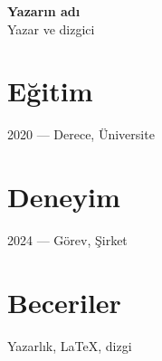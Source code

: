 \documentclass[11pt]{article}
\begin{document}
{\Large\bfseries Yazarın adı}\\[4pt]
{\large Yazar ve dizgici}

\vspace{8pt}

\section*{Eğitim}
2020 — Derece, Üniversite

\section*{Deneyim}
2024 — Görev, Şirket

\section*{Beceriler}
Yazarlık, LaTeX, dizgi
\end{document}
